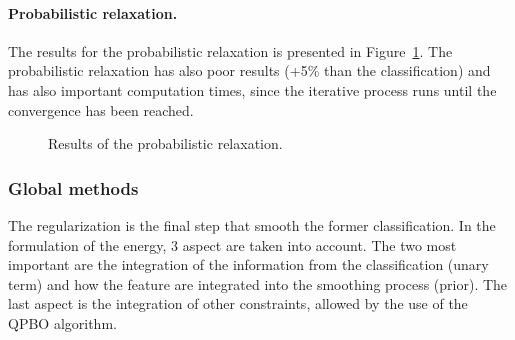 \paragraph{Probabilistic relaxation. \\}
The results for the probabilistic relaxation is presented in Figure~\ref{fig:C3_S3_ss4_prob}. The probabilistic relaxation has also poor results (+5\% than the classification) and has also important computation times, since the iterative process runs until the convergence has been reached.

\begin{figure}[htbp]
\begin{center}
\begingroup
\captionsetup[subfigure]{width=0.425\textwidth}
\hspace*{0.025\textwidth}
\endgroup
\caption{Results of the probabilistic relaxation.}
\label{fig:C3_S3_ss4_prob}
\end{center}
\end{figure}

\subsubsection{Global methods}
The regularization is the final step that smooth the former classification. In the formulation of the energy, 3 aspect are taken into account. The two most important are the integration of the information from the classification (unary term) and how the feature are integrated into the smoothing process (prior). The last aspect is the integration of other constraints, allowed by the use of the QPBO algorithm.

